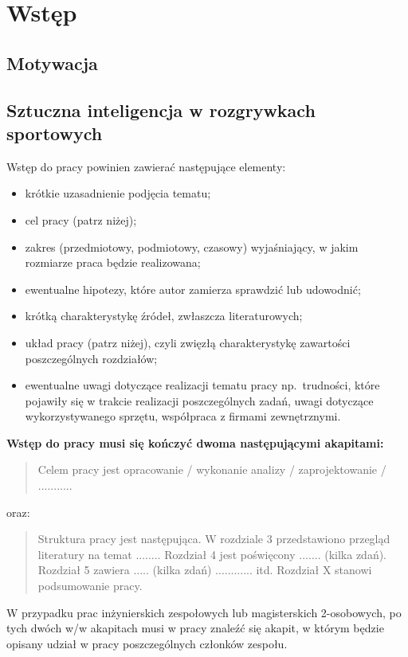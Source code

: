 
\chapter{Wstęp}
\section{Motywacja}
\section{Sztuczna inteligencja w rozgrywkach sportowych}
Wstęp do pracy powinien zawierać następujące elementy:
\begin{itemize}
    \item krótkie uzasadnienie podjęcia tematu; 
    \item cel pracy (patrz niżej); 
    \item zakres (przedmiotowy, podmiotowy, czasowy) wyjaśniający, w jakim rozmiarze praca będzie realizowana; 
    \item ewentualne hipotezy, które autor zamierza sprawdzić lub udowodnić; 
    \item krótką charakterystykę źródeł, zwłaszcza literaturowych; 
    \item układ pracy (patrz niżej), czyli zwięzłą charakterystykę zawartości poszczególnych rozdziałów; 
    \item ewentualne uwagi dotyczące realizacji tematu pracy np.~trudności, które pojawiły się w trakcie 
    realizacji poszczególnych zadań, uwagi dotyczące wykorzystywanego sprzętu, współpraca z firmami zewnętrznymi. 
\end{itemize}

\noindent
\textbf{Wstęp do pracy musi się kończyć dwoma następującymi akapitami:}
\begin{quote}
Celem pracy jest opracowanie / wykonanie analizy / zaprojektowanie / ...........
\end{quote}
oraz:
\begin{quote}
Struktura pracy jest następująca. W rozdziale 3 przedstawiono przegląd literatury na temat ........ 
Rozdział 4 jest poświęcony ....... (kilka zdań). 
Rozdział 5 zawiera ..... (kilka zdań) ............ itd. 
Rozdział X stanowi podsumowanie pracy. 
\end{quote}

W przypadku prac inżynierskich zespołowych lub magisterskich 2-osobowych, po tych dwóch w/w akapitach 
musi w pracy znaleźć się akapit, w którym będzie opisany udział w pracy poszczególnych członków zespołu.


